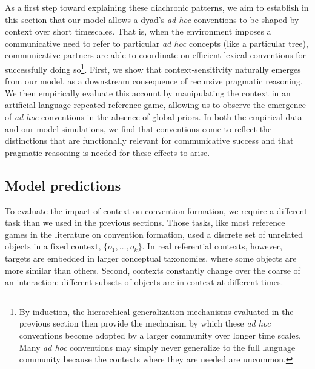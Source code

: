 As a first step toward explaining these diachronic patterns, we aim to establish in this section that our model allows a dyad's \emph{ad hoc} conventions to be shaped by context over short timescales.
That is, when the environment imposes a communicative need to refer to particular \emph{ad hoc} concepts (like a particular tree), communicative partners are able to coordinate on efficient lexical conventions for successfully doing so\footnote{By induction, the hierarchical generalization mechanisms evaluated in the previous section then provide the mechanism by which these \emph{ad hoc} conventions become adopted by a larger community over longer time scales. Many \emph{ad hoc} conventions may simply never generalize to the full language community because the contexts where they are needed are uncommon.}.
First, we show that context-sensitivity naturally emerges from our model, as a downstream consequence of recursive pragmatic reasoning.
We then empirically evaluate this account by manipulating the context in an artificial-language repeated reference game, allowing us to observe the emergence of \emph{ad hoc} conventions in the absence of global priors.
In both the empirical data and our model simulations, we find that conventions come to reflect the distinctions that are functionally relevant for communicative success and that pragmatic reasoning is needed for these effects to arise. 

\subsection{Model predictions}

To evaluate the impact of context on convention formation, we require a different task than we used in the previous sections.
Those tasks, like most reference games in the literature on convention formation, used a discrete set of unrelated objects in a fixed context, $\{o_1, \dots, o_k\}$. 
In real referential contexts, however, targets are embedded in larger conceptual taxonomies, where some objects are more similar than others.
Second, contexts constantly change over the coarse of an interaction: different subsets of objects are in context at different times.

